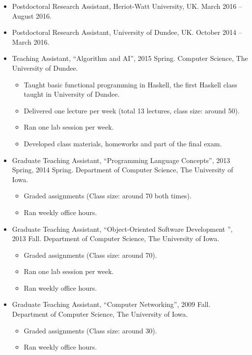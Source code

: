 \documentclass{article}
\begin{document}
\begin{itemize}
 \item Postdoctoral Research Assistant, Heriot-Watt University, UK. March 2016 -- August 2016.
\item Postdoctoral Research Assistant, University of Dundee, UK. October 2014 -- March 2016.

\item Teaching Assistant,  ``Algorithm and AI'', 2015 Spring.  Computer Science, The University of Dundee.
  \begin{itemize}
  \item Taught basic functional programming in Haskell, the first Haskell class taught in University of Dundee. 
  \item Delivered one lecture per week (total 13 lectures, class size: around 50). 
  \item Ran one lab session per week.  
  \item Developed class materials, homeworks and part of the final exam.  
  \end{itemize}
  
\item Graduate Teaching Assistant,  ``Programming Language Concepts'', 2013 Spring, 2014 Spring. Department of Computer Science, The University of Iowa.
  \begin{itemize}
  \item Graded assignments (Class size: around 70 both times).
  \item Ran weekly office hours. 
  \end{itemize}
  
\item Graduate Teaching Assistant,  ``Object-Oriented Software Development '', 2013 Fall. Department of Computer Science, The University of Iowa.
    \begin{itemize}
  \item Graded assignments (Class size: around 70).  
   \item Ran one lab session per week.  
  \item Ran weekly office hours. 
  \end{itemize}

  \item Graduate Teaching Assistant, ``Computer Networking'', 2009 Fall. Department of Computer Science, The University of Iowa.
      \begin{itemize}
  \item Graded assignments (Class size: around 30).
  \item Ran weekly office hours. 
    \end{itemize}

\end{itemize}
\end{document}

